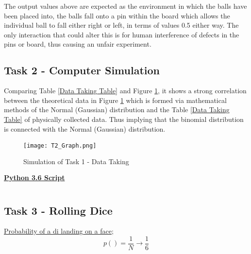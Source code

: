 \documentclass[11pt]{article}
\begin{document}
\bigskip

The output values above are expected as the environment in which the balls have been placed into, the balls fall onto a pin within the board which allows the individual ball to fall either right or left, in terms of values 0.5 either way. The only interaction that could alter this is for human interference of defects in the pins or board, thus causing an unfair experiment.\\


\subsection{Task 2 - Computer Simulation}
\label{Task 2 - Computer Simulation SubSection}

Comparing Table \ref{Data Taking Table} and Figure \ref{T2 Graph}, it shows a strong correlation between the theoretical data in Figure \ref{T2 Graph} which is formed via mathematical methods of the Normal (Gaussian) distribution and the Table \ref{Data Taking Table} of physically collected data. Thus implying that the binomial distribution is connected with the Normal (Gaussian) distribution.\\

\begin{figure}[H]
\centering
\texttt{[image: T2\_Graph.png]}
\caption{Simulation of Task 1 - Data Taking}
\label{T2 Graph}
\end{figure}
\bigskip

\textbf{\underline{Python 3.6 Script}}
\inputminted[breaklines]{python3}{Task_2_Script.py}


\subsection{Task 3 - Rolling Dice}
\label{Task 3 - Rolling Dice SubSection}

\underline{Probability of a di landing on a face};
\begin{equation} \label{Q3.1}
p() = \dfrac{1}{N} \rightarrow \dfrac{1}{6}
\end{equation}
\end{document}
